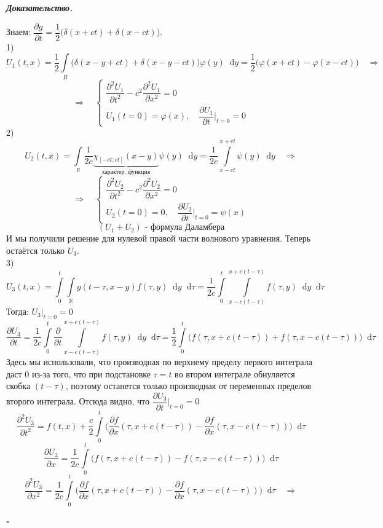 \documentclass[11pt,a4paper]{report}
\numberwithin{equation}{section}
\numberwithin{figure}{chapter}
\numberwithin{table}{chapter}
\newenvironment{myproof}{%
    \begin{tcolorbox}[mathphysblock,colframe=proofcolor!65,colback=proofcolor!2,boxrule=0.5pt]
    \textit{\textbf{Доказательство.}}\par\smallskip
}{%
    \hfill$\square$
    \end{tcolorbox}
}
\newcommand{\R}{\mathbb{R}}
\newcommand{\dd}{\mathop{}\!\mathrm{d}}
\renewcommand{\phi}{\varphi}
\begin{document}
\begin{myproof}
   Знаем: \(\dfrac{\partial g}{\partial t}=\dfrac{1}{2}\big(\delta(x+ct)+\delta(x-ct)\big)\). \\
   1) \[U_1(t,x)=\dfrac{1}{2}\int\limits_{R}\big(\delta(x-y+ct)+\delta(x-y-ct)\big)\phi(y)\dd y=\dfrac{1}{2}\big(\phi(x+ct)-\phi(x-ct)\big) \quad \Rightarrow\]
   \[\Rightarrow \quad \begin{cases}
    \dfrac{\partial^2 U_1}{\partial t^2}-c^2\dfrac{\partial^2 U_1}{\partial x^2}=0 \\
    U_1(t=0)=\phi(x), \quad \dfrac{\partial U_1}{\partial t}\bigg|_{t=0}=0
   \end{cases}\]
   2) \[U_2(t, x)=\int\limits_\R \dfrac{1}{2c}\underbrace{\chi_{[-ct; ct]}(x-y)}_\text{характер. функция}\psi(y)\dd y=\dfrac{1}{2c}\int\limits_{x-ct}^{x+ct}\psi(y)\dd y \quad \Rightarrow\]
   \[\Rightarrow \quad \begin{cases}
    \dfrac{\partial^2 U_2}{\partial t^2}-c^2\dfrac{\partial^2 U_2}{\partial x^2}=0 \\
    U_2(t=0)=0, \quad \dfrac{\partial U_2}{\partial t}\bigg|_{t=0}=\psi(x)
   \end{cases}\]
   \[(U_1+U_2)\text{ - формула Даламбера}\]
   И мы получили решение для нулевой правой части волнового уравнения. Теперь остаётся только $U_3$. \\
   3) \[U_3(t, x)=\int\limits_{0}^{t}\int\limits_\R g(t-\tau, x-y)f(\tau, y)\dd y\dd \tau=\dfrac{1}{2c}\int\limits_{0}^{t}\int\limits_{x-c(t-\tau)}^{x+c(t-\tau)}f(\tau, y)\dd y\dd \tau\]
   Тогда: \(U_3\big|_{t=0}=0\)
   \[\dfrac{\partial U_3}{\partial t}=\dfrac{1}{2c}\int\limits_{0}^{t}\dfrac{\partial}{\partial t}\int\limits_{x-c(t-\tau)}^{x+c(t-\tau)}f(\tau, y)\dd y\dd \tau=\dfrac{1}{2}\int\limits_{0}^{t}\big(f(\tau, x+c(t-\tau))+f(\tau, x-c(t-\tau))\big)\dd \tau\]
   Здесь мы использовали, что производная по верхнему пределу первого интеграла даст 0 из-за того, что при подстановке $\tau=t$ во втором интеграле обнуляется скобка $(t-\tau)$, поэтому останется только производная от переменных пределов второго интеграла. Отсюда видно, что \(\dfrac{\partial U_3}{\partial t}\bigg|_{t=0}=0\) \\
   \[\dfrac{\partial^2 U_3}{\partial t^2}=f(t,x)+\dfrac{c}{2}\int\limits_{0}^{t}\bigg(\dfrac{\partial f}{\partial x}(\tau, x+c(t-\tau))-\dfrac{\partial f}{\partial x}(\tau, x-c(t-\tau))\bigg)\dd \tau\]
   \[\dfrac{\partial U_3}{\partial x}=\dfrac{1}{2c}\int\limits_{0}^{t}\big(f(\tau, x+c(t-\tau))-f(\tau, x-c(t-\tau))\big)\dd \tau\]
   \[\dfrac{\partial^2 U_3}{\partial x^2}=\dfrac{1}{2c}\int\limits_{0}^{t}\bigg(\dfrac{\partial f}{\partial x}(\tau, x+c(t-\tau))-\dfrac{\partial f}{\partial x}(\tau, x-c(t-\tau))\bigg)\dd\tau \quad \Rightarrow\]

\end{myproof}
\end{document}
